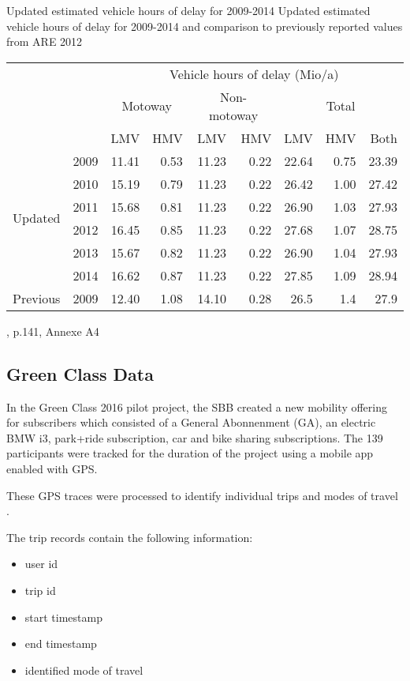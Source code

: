 \createtable%
{Updated estimated vehicle hours of delay for 2009-2014}%
{Updated estimated vehicle hours of delay for 2009-2014 and comparison to previously reported values from ARE 2012}%
{\label{tab:vehHoursDelayMkInfras}}%
{%
  \begin{tabular}[c]{lrrrrrrrr}
    \toprule
    \multirow{3}{*}{} & & \multicolumn{7}{c}{Vehicle hours of delay (Mio/a)}\\ 
    & & \multicolumn{2}{c}{Motoway} & \multicolumn{2}{c}{Non-motoway} & \multicolumn{3}{c}{Total}\\
    & &  LMV & HMV & LMV & HMV & LMV & HMV & Both\\
    \midrule
    \multirow{6}{*}{Updated}
    & 2009 & 11.41 & 0.53 & 11.23 & 0.22 & 22.64 & 0.75 & 23.39 \\
	& 2010 & 15.19 & 0.79 & 11.23 & 0.22 & 26.42 & 1.00 & 27.42 \\
	& 2011 & 15.68 & 0.81 & 11.23 & 0.22 & 26.90 & 1.03 & 27.93 \\
	& 2012 & 16.45 & 0.85 & 11.23 & 0.22 & 27.68 & 1.07 & 28.75 \\
	& 2013 & 15.67 & 0.82 & 11.23 & 0.22 & 26.90 & 1.04 & 27.93 \\
	& 2014 & 16.62 & 0.87 & 11.23 & 0.22 & 27.85 & 1.09 & 28.94 \\
	\midrule
	Previous & 2009 & 12.40 & 1.08 & 14.10 & 0.28 & 26.5 & 1.4 & 27.9 \\
    \bottomrule
  \end{tabular}
}%
{\cite{mkinfras2016staukosten}, p.141, Annexe A4}




\subsection{Green Class Data}
In the Green Class 2016 pilot project, the SBB created a new mobility offering for subscribers which consisted of a General Abonnenment (GA), an electric BMW i3, park+ride subscription, car and bike sharing subscriptions.
The 139 participants were tracked for the duration of the project using a mobile app enabled with GPS.

 These GPS traces were processed to identify individual trips and modes of travel \cite{rabaul2016greenclassprocessing}.

The trip records contain the following information:
\begin{itemize}
  \item user id
  \item trip id
  \item start timestamp
  \item end timestamp
  \item identified mode of travel
\end{itemize}

